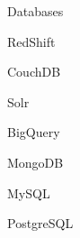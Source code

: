 \begin{skillset}{Databases}
  \item RedShift
  \item CouchDB
  \item Solr
  \item BigQuery
  \item MongoDB
  \item MySQL
  \item PostgreSQL
\end{skillset}
